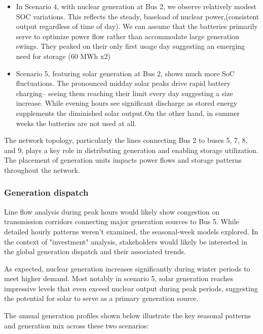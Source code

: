 \begin{itemize}
    \item In Scenario 4, with nuclear generation at Bus 2, we observe relatively modest SOC variations. This 
    reflects the steady, baseload of nuclear power,(consistent output regardless of time of day). We can assume 
    that the batteries primarily serve to optimize power flow rather than accommodate large generation swings.
    They peaked on their only first usage day suggesting an emerging need for storage (60 MWh x2)
    
    \item Scenario 5, featuring solar generation at Bus 2, shows much more SoC fluctuations. The 
    pronounced midday solar peaks drive rapid battery charging-- seeing them reaching their limit every day 
    suggesting a size increase. While evening hours see significant discharge as stored energy supplements 
    the diminished solar output.On the other hand, in summer weeks the batteries are not used at all.
\end{itemize}

The network topology, particularly the lines connecting Bus 2 to buses 5, 7, 8, and 9, plays a key role in 
distributing generation and enabling storage utilization. The placement of generation units impacts power flows 
and storage patterns throughout the network.

\subsubsection{Generation dispatch}
Line flow analysis during peak hours would likely show congestion on transmission corridors connecting major generation 
sources to Bus 5. While detailed hourly patterns weren't examined, the seasonal-week models explored. In the context
of "investment" analysis, stakeholders would likely be interested in the global generation dispatch and their associated
trends.

As expected, nuclear generation increases significantly during winter periods to meet higher demand. 
Most notably in scenario 5, solar generation reaches impressive levels that even exceed nuclear output during peak 
periods, suggesting the potential for solar to serve as a primary generation source.

The annual generation profiles shown below illustrate the key seasonal patterns and generation mix across these two 
scenarios:

